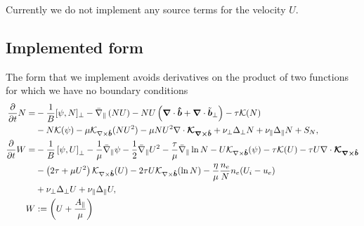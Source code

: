 Currently we do not implement any source terms for the velocity $U$.

\subsection{Implemented form}
The form that we implement avoids derivatives on the product of
two functions for which we have no boundary conditions
\begin{subequations}
    \begin{align}
    \frac{\partial}{\partial t} N =&
        - \frac{1}{B}[\psi, N]_{\perp}%
        - \bar \nabla_\parallel \left( NU\right)
        - NU\left(\vec \nabla\cdot\bhat+\vec \nabla\cdot\tilde{\vec b}_\perp\right)
        - \tau \mathcal K(N) \nonumber \\&
        - N \mathcal K(\psi)
        -\mu \mathcal K_{\nabla\times\bhat}(NU^2)
        -\mu NU^2\nabla\cdot \vec{ \mathcal K_{\nabla\times\bhat}}
        + \nu_\perp\Delta_\perp N + \nu_\parallel \Delta_\parallel N + S_N, \\
    \frac{\partial}{\partial t} W =&
        - \frac{1}{B}\left[\psi, U\right]_{\perp}%
        - \frac{1}{\mu} \bar \nabla_\parallel \psi%
        - \frac{1}{2}\bar \nabla_\parallel U^2
        -\frac{\tau}{\mu} \bar \nabla_\parallel \ln N
        - U\mathcal K_{\nabla\times\bhat}(\psi)
        - \tau \mathcal K(U)
        -\tau U\nabla\cdot\vec{ \mathcal K_{\nabla\times\bhat}}\nonumber\\&
        - \left(2\tau + {\mu}U^2\right) \mathcal K_{\nabla\times\bhat} (U)
        -2\tau U\mathcal K_{\nabla\times\bhat}(\ln N)
        - \frac{\eta}{\mu} \frac{n_e}{N}n_e(U_i - u_e) \nonumber\\&
        + \nu_\perp\Delta_\perp U
        + \nu_\parallel \Delta_\parallel U,
        \label{eq:EgyrofluidU} \\
        W&:= \left( U + \frac{A_\parallel}{\mu}\right)
    \end{align}
    \label{eq:Egyrofluid}
\end{subequations}
